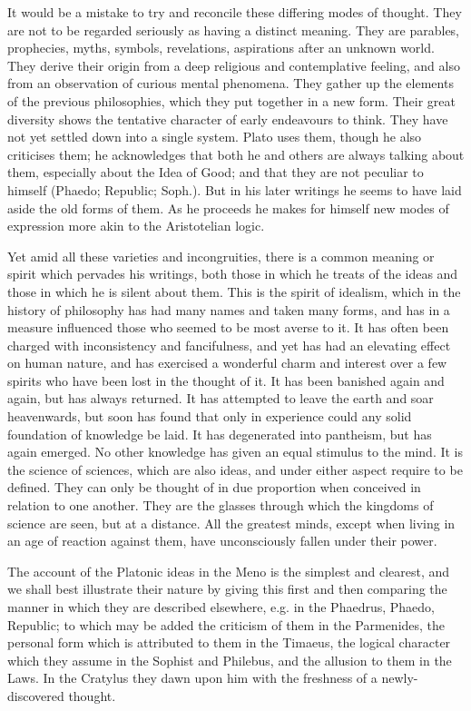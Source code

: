\documentclass[11pt,letter]{article}
\begin{document}
\par  It would be a mistake to try and reconcile these differing modes of thought. They are not to be regarded seriously as having a distinct meaning. They are parables, prophecies, myths, symbols, revelations, aspirations after an unknown world. They derive their origin from a deep religious and contemplative feeling, and also from an observation of curious mental phenomena. They gather up the elements of the previous philosophies, which they put together in a new form. Their great diversity shows the tentative character of early endeavours to think. They have not yet settled down into a single system. Plato uses them, though he also criticises them; he acknowledges that both he and others are always talking about them, especially about the Idea of Good; and that they are not peculiar to himself (Phaedo; Republic; Soph.). But in his later writings he seems to have laid aside the old forms of them. As he proceeds he makes for himself new modes of expression more akin to the Aristotelian logic.

\par  Yet amid all these varieties and incongruities, there is a common meaning or spirit which pervades his writings, both those in which he treats of the ideas and those in which he is silent about them. This is the spirit of idealism, which in the history of philosophy has had many names and taken many forms, and has in a measure influenced those who seemed to be most averse to it. It has often been charged with inconsistency and fancifulness, and yet has had an elevating effect on human nature, and has exercised a wonderful charm and interest over a few spirits who have been lost in the thought of it. It has been banished again and again, but has always returned. It has attempted to leave the earth and soar heavenwards, but soon has found that only in experience could any solid foundation of knowledge be laid. It has degenerated into pantheism, but has again emerged. No other knowledge has given an equal stimulus to the mind. It is the science of sciences, which are also ideas, and under either aspect require to be defined. They can only be thought of in due proportion when conceived in relation to one another. They are the glasses through which the kingdoms of science are seen, but at a distance. All the greatest minds, except when living in an age of reaction against them, have unconsciously fallen under their power.

\par  The account of the Platonic ideas in the Meno is the simplest and clearest, and we shall best illustrate their nature by giving this first and then comparing the manner in which they are described elsewhere, e.g. in the Phaedrus, Phaedo, Republic; to which may be added the criticism of them in the Parmenides, the personal form which is attributed to them in the Timaeus, the logical character which they assume in the Sophist and Philebus, and the allusion to them in the Laws. In the Cratylus they dawn upon him with the freshness of a newly-discovered thought.
\end{document}
